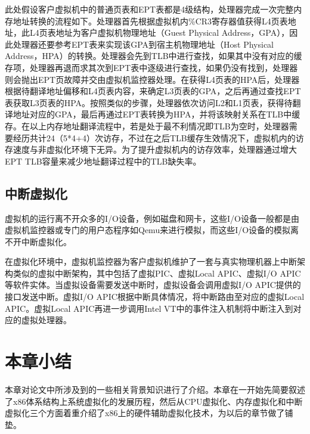 此处假设客户虚拟机中的普通页表和EPT表都是4级结构，处理器完成一次完整内存地址转换的流程如下。处理器首先根据虚拟机内\%CR3寄存器值获得L4页表地址，此L4页表地址为客户虚拟机物理地址（Guest Physical Address，GPA），因此处理器还要参考EPT表来实现该GPA到宿主机物理地址（Host Physical Address，HPA）的转换。处理器会先到TLB中进行查找，如果其中没有对应的缓存项，处理器再退而求其次到EPT表中逐级进行查找，如果仍没有找到，处理器则会抛出EPT页故障并交由虚拟机监控器处理。在获得L4页表的HPA后，处理器根据待翻译地址偏移和L4页表内容，来确定L3页表的GPA，之后再通过查找EPT表获取L3页表的HPA。按照类似的步骤，处理器依次访问L2和L1页表，获得待翻译地址对应的GPA，最后再通过EPT表转换为HPA，并将该映射关系在TLB中缓存。在以上内存地址翻译流程中，若是处于最不利情况即TLB为空时，处理器需要经历共计24（5*4+4）次访存，不过在之后TLB缓存生效情况下，虚拟机内的访存速度与非虚拟化环境下无异。为了提升虚拟机内的访存效率，处理器通过增大EPT TLB容量来减少地址翻译过程中的TLB缺失率。

\subsection{中断虚拟化}

虚拟机的运行离不开众多的I/O设备，例如磁盘和网卡，这些I/O设备一般都是由虚拟机监控器或专门的用户态程序如Qemu来进行模拟，而这些I/O设备的模拟离不开中断虚拟化。

在虚拟化环境中，虚拟机监控器为客户虚拟机维护了一套与真实物理机器上中断架构类似的虚拟中断架构，其中包括了虚拟PIC、虚拟Local APIC、虚拟I/O APIC等软件实体。当虚拟设备需要发送中断时，虚拟设备会调用虚拟I/O APIC提供的接口发送中断。虚拟I/O APIC根据中断具体情况，将中断路由至对应的虚拟Local APIC。虚拟Local APIC再进一步调用Intel VT中的事件注入机制将中断注入到对应的虚拟处理器。

\section{本章小结}

本章对论文中所涉及到的一些相关背景知识进行了介绍。本章在一开始先简要叙述了x86体系结构上系统虚拟化的发展历程，然后从CPU虚拟化、内存虚拟化和中断虚拟化三个方面着重介绍了x86上的硬件辅助虚拟化技术，为以后的章节做了铺垫。